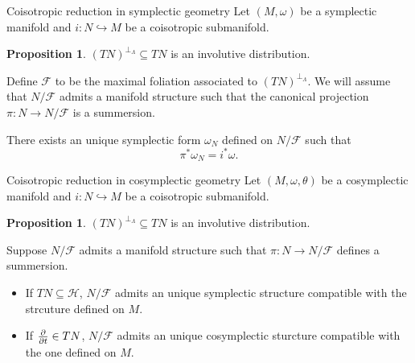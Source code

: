 \documentclass{beamer}
\theoremstyle{definition}
\newtheorem{proposition}[theorem]{Proposition}
\begin{document}
\begin{frame}{Coisotropic reduction in symplectic geometry}
Let $(M, \omega)$ be a \alert<1>{symplectic manifold} and $i:N \hookrightarrow M$ be a \alert<1>{coisotropic submanifold}. \pause
\begin{proposition}
$(TN)^{\perp_\Lambda} \subseteq TN$ is an involutive distribution.
\end{proposition}
\pause
Define $\mathcal{F}$ to be the maximal foliation associated to $(TN)^{\perp_\Lambda}$. We will assume that $N/ \mathcal{F}$ admits a manifold structure such that the canonical projection $\pi: N \rightarrow N/ \mathcal{F}$ is a summersion. \pause
\begin{theorem}[Weinstein] There exists an unique \alert<4>{symplectic} form $\omega_N$ defined on $N/ \mathcal{F}$ such that $$\pi^\ast \omega_N = i^\ast \omega.$$
\end{theorem}
\end{frame}
\begin{frame}{Coisotropic reduction in cosymplectic geometry}
Let $(M, \omega, \theta)$ be a \alert<1>{cosymplectic manifold} and $i: N \hookrightarrow M$ be a \alert<1>{coisotropic submanifold}. \pause
\begin{proposition}
$(TN)^{\perp_\Lambda} \subseteq TN$ is an involutive distribution.
\end{proposition}\pause
Suppose $N/ \mathcal{F}$ admits a manifold structure such that $\pi: N \rightarrow N/ \mathcal{F}$ defines a summersion.\pause
\begin{theorem}
\begin{itemize}
\item If $TN \subseteq \mathcal{H}$, $N/ \mathcal{F}$ admits an unique \alert<4>{symplectic structure} compatible with the strcuture defined on $M$.\pause
\item If $\pdv{t} \in TN$, $N/ \mathcal{F}$ admits an unique \alert<5>{cosymplectic sturcture} compatible with the one defined on $M$.
\end{itemize}
\end{theorem}
\end{frame}

\end{document}
